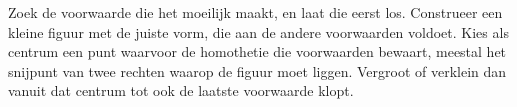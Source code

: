 \begin{werkwijze}
Zoek de voorwaarde die het moeilijk maakt, en laat die eerst los. Construeer een kleine figuur met de juiste vorm, die aan de andere voorwaarden voldoet. Kies als centrum een punt waarvoor de homothetie die voorwaarden bewaart, meestal het snijpunt van twee rechten waarop de figuur moet liggen. Vergroot of verklein dan vanuit dat centrum tot ook de laatste voorwaarde klopt.
\end{werkwijze}


\begin{oefeningen}
\end{oefeningen}

\opdrachtenkop

\begin{oefeningen}























\end{oefeningen}


